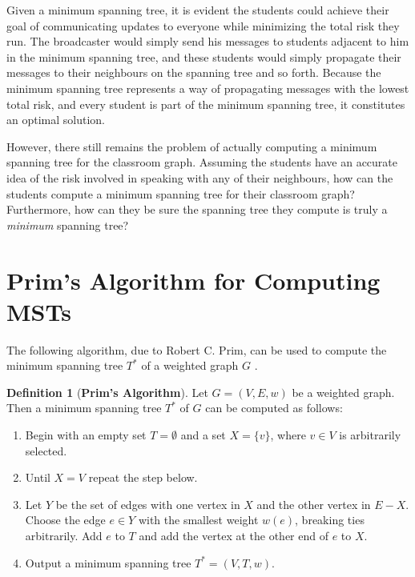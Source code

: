 \documentclass[a4paper,11pt]{report}
\theoremstyle{plain}
\theoremstyle{definition}
\newtheorem{defn}[thm]{Definition}
\begin{document}
Given a minimum spanning tree, it is evident the students could achieve their
goal of communicating updates to everyone while minimizing the total risk they
run. The broadcaster would simply send his messages to students adjacent to
him in the minimum spanning tree, and these students would simply propagate
their messages to their neighbours on the spanning tree and so forth. Because
the minimum spanning tree represents a way of propagating messages with the
lowest total risk, and every student is part of the minimum spanning tree, it
constitutes an optimal solution.

However, there still remains the problem of actually computing a minimum
spanning tree for the classroom graph. Assuming the students have an accurate
idea of the risk involved in speaking with any of their neighbours, how can the
students compute a minimum spanning tree for their classroom graph?
Furthermore, how can they be sure the spanning tree they compute is truly a
\emph{minimum} spanning tree?


\section{Prim's Algorithm for Computing MSTs}

The following algorithm, due to Robert C. Prim, can be used to compute
the minimum spanning tree $T^*$ of a weighted graph $G$
\cite[pp. 634--636]{clrs}.

\begin{defn}[{\bfseries Prim's Algorithm}]\label{prim-alg}
Let $G = (V, E, w)$ be a weighted graph. Then a minimum spanning tree $T^*$ of
$G$ can be computed as follows:
\begin{enumerate}
    \item Begin with an empty set $T = \emptyset$ and a set $X
    = \{v\}$, where $v \in V$ is arbitrarily selected.
    \item Until $X = V$ repeat the step below.
    \item Let $Y$ be the set of edges with one vertex in $X$ and the other
    vertex in $E - X$. Choose the edge $e \in Y$ with the smallest weight
    $w(e)$, breaking ties arbitrarily. Add $e$ to $T$ and add the vertex at
    the other end of $e$ to $X$.
    \item Output a minimum spanning tree $T^* = (V, T, w)$.
\end{enumerate}
\end{defn}
\end{document}
